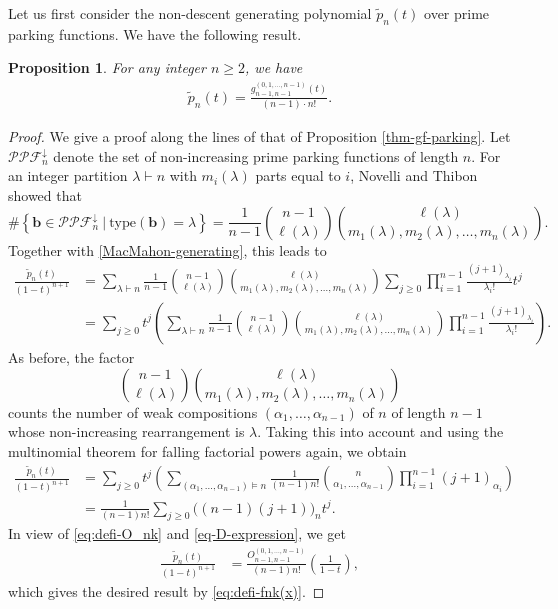 \documentclass[12pt]{article}
\newtheorem{prop}[thm]{Proposition}
\newcommand{\PPF}{\mathcal{PPF}}
\newcommand{\type}{\mathrm{type}}
\newcommand{\PPP}{\tilde{p}}
\numberwithin{equation}{section}
\begin{document}
Let us first consider the non-descent generating polynomial
$\PPP_n(t)$ over prime parking functions. We have the following result. 

\begin{prop}\label{prop-ppf-operator}
For any integer $n\ge 2$, we have
\begin{align}\label{eq-ppn-gnmv-def-prime}
\PPP_n(t)=\frac{g^{(0,1,\ldots,n-1)}_{n-1,n-1}(t)}{(n-1)\cdot n!}.
\end{align}
\end{prop}

\begin{proof} 
We give a proof along the lines of that of Proposition \ref{thm-gf-parking}.
Let $\PPF_n^\downarrow$ denote the set of non-increasing prime parking functions of length $n$.
For an integer  partition
$\lambda\vdash n$ with $m_i(\lambda)$ parts equal to $i$, Novelli and Thibon \cite[Eq. (286)]{Novelli-Thibon-2007} showed that
$$\#\left \{ \mathbf{b} \in \PPF_n^{\downarrow} ~\big|~\type( \mathbf{b})=\lambda \right \}
=\frac{1}{n-1}\binom{n-1}{\ell(\lambda)}\binom{\ell(\lambda)}{m_1(\lambda),m_2(\lambda),\ldots,m_n(\lambda)}.$$
Together with \eqref{MacMahon-generating}, this leads to 
    \begin{align*}
\frac{\PPP_n(t)}{(1-t)^{n+1}}
&=\sum_{\lambda\vdash n}
\frac{1}{n-1}\binom{n-1}{\ell(\lambda)}\binom{\ell(\lambda)}{m_1(\lambda),m_2(\lambda),\ldots,m_n(\lambda)}
\sum_{j \geq 0}\prod_{i=1}^{n-1}\frac{\left(j+1\right)_{\lambda_i}}{\lambda_i!}t^j\\[5pt]
&=\sum_{j \geq 0}t^j\left(\sum_{\lambda\vdash n}
\frac{1}{n-1}\binom{n-1}{\ell(\lambda)}\binom{\ell(\lambda)}{m_1(\lambda),m_2(\lambda),\ldots,m_n(\lambda)}
\prod_{i=1}^{n-1}\frac{\left(j+1\right)_{\lambda_i}}{\lambda_i!}\right).
\end{align*}
{As before, the factor 
$$\binom{n-1}{\ell(\lambda)}\binom{\ell(\lambda)}{m_1(\lambda),m_2(\lambda),\ldots,m_n(\lambda)}$$
counts the number of weak compositions $(\alpha_1,\ldots,\alpha_{n-1})$ of $n$ of length $n-1$ whose non-increasing rearrangement is $\lambda$.} Taking this into account and using the multinomial theorem for falling factorial powers again, we obtain
\begin{align*}
\frac{\PPP_n(t)}{(1-t)^{n+1}}
&=\sum_{j \geq 0}t^{j}\left(\sum_{(\alpha_1,\ldots,\alpha_{n-1})\vDash n}
\frac{1}{(n-1)n!}\binom{n}{\alpha_1,\ldots,\alpha_{n-1}}\prod_{i=1}^{n-1}{\left(j+1\right)_{\alpha_i}}\right)\\[5pt]
&=\frac{1}{(n-1)n!}\sum_{j \geq 0}\big((n-1)(j+1)\big)_{n}t^j.
\end{align*}
In view of \eqref{eq:defi-O_nk} and \eqref{eq-D-expression}, we get
\begin{align*}
\frac{\PPP_n(t)}{(1-t)^{n+1}}&=\frac{ O^{(0,1,\ldots,n-1)}_{n-1,n-1}}{(n-1)n!}\left(\frac{1}{1-t}\right),
\end{align*}
which gives the desired result by \eqref{eq:defi-fnk(x)}. 
\end{proof}
\end{document}
